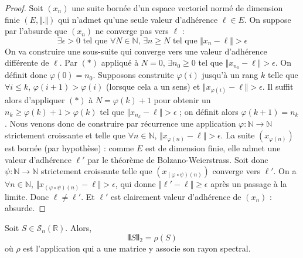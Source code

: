   \begin{proof}
    Soit $(x_n)$ une suite bornée d'un espace vectoriel normé de dimension finie $(E, \Vert . \Vert)$ qui n'admet qu'une seule valeur d'adhérence $\ell \in E$. On suppose par l'absurde que $(x_n)$ ne converge pas vers $\ell$ :
    \[ \exists \epsilon > 0 \text{ tel que } \forall N \in \mathbb{N}, \, \exists n \geq N \text{ tel que } \Vert x_n - \ell \Vert > \epsilon \tag{$*$} \]
    On va construire une sous-suite qui converge vers une valeur d'adhérence différente de $\ell$.
    \newpar
    Par $(*)$ appliqué à $N = 0$, $\exists n_0 \geq 0$ tel que $\Vert x_{n_0} - \ell \Vert > \epsilon$. On définit donc $\varphi(0) = n_0$.
    \newpar
    Supposons construite $\varphi(i)$ jusqu'à un rang $k$ telle que $\forall i \leq k$, $\varphi(i+1) > \varphi(i)$ (lorsque cela a un sens) et $\Vert x_{\varphi(i)} - \ell \Vert > \epsilon$. Il suffit alors d'appliquer $(*)$ à $N = \varphi(k) + 1$ pour obtenir un $n_k \geq \varphi(k) + 1 > \varphi(k)$ tel que $\Vert x_{n_k} - \ell \Vert > \epsilon$ ; on définit alors $\varphi(k+1) = n_k$.
    \newpar
    Nous venons donc de construire par récurrence une application $\varphi : \mathbb{N} \rightarrow \mathbb{N}$ strictement croissante et telle que $\forall n \in \mathbb{N}$, $\Vert x_{\varphi(n)} - \ell \Vert > \epsilon$. La suite $(x_{\varphi(n)})$ est bornée (par hypothèse) : comme $E$ est de dimension finie, elle admet une valeur d'adhérence $\ell'$ par le théorème de Bolzano-Weierstrass. Soit donc $\psi : \mathbb{N} \rightarrow \mathbb{N}$ strictement croissante telle que $(x_{(\varphi \circ \psi)(n)})$ converge vers $\ell'$.
    \newpar
    On a $\forall n \in \mathbb{N}$, $\Vert x_{(\varphi \circ \psi)(n)} - \ell \Vert > \epsilon$, qui donne $\Vert \ell' - \ell \Vert \geq \epsilon$ après un passage à la limite. Donc $\ell \neq \ell'$.  Et $\ell'$ est clairement valeur d'adhérence de $(x_n)$ : absurde.
  \end{proof}


  \begin{lemma}
    \label{homeomorphisme-de-l-exponentielle-3}
    Soit $S \in \mathcal{S}_n(\mathbb{R})$. Alors,
    \[ \VERT S \VERT_2 = \rho(S) \]
    où $\rho$ est l'application qui a une matrice y associe son rayon spectral.
  \end{lemma}

